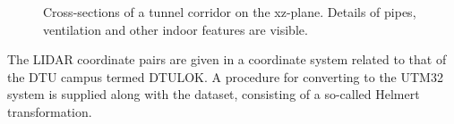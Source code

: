 \begin{figure}
    \centering
    \caption{Cross-sections of a tunnel corridor on the xz-plane. Details of pipes, ventilation and other indoor features are visible.}\label{fig:tunnel_cross_section}
    \vspace{2em}
\end{figure}

The LIDAR coordinate pairs are given in a coordinate system related to that of the DTU campus termed DTULOK. A procedure for converting to the UTM32 system is supplied along with the dataset, consisting of a so-called Helmert transformation. 


